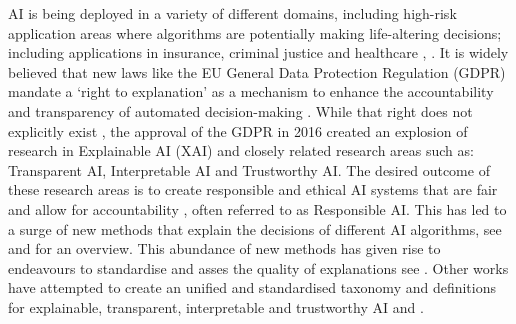 \documentclass[manuscript,screen,review]{acmart}
\begin{document}



AI is being deployed in a variety of different domains, including high-risk application areas where algorithms are potentially making life-altering decisions; including applications in insurance, criminal justice and healthcare \cite{Bohr2020}, \cite{Chen2018}. It is widely believed that new laws like the EU General Data Protection Regulation (GDPR) mandate a ‘right to explanation’ as a mechanism to enhance the accountability and transparency of automated decision-making \cite{Wachter2017}. While that right does not explicitly exist \cite{Wachter2017}, the approval of the GDPR in 2016 created an explosion of research in Explainable AI (XAI) and closely related research areas such as: Transparent AI, Interpretable AI and Trustworthy AI. The desired outcome of these research areas is to create responsible and ethical AI systems that are fair and allow for accountability \cite{Mohseni2021}, often referred to as Responsible AI. This has led to a surge of new methods that explain the decisions of different AI algorithms, see \cite{Linardatos2021} and \cite{Guidotti2018a} for an overview. This abundance of new methods has given rise to endeavours to standardise and asses the quality of explanations see \cite{Gilpin2019}. Other works have attempted to create an unified and standardised taxonomy and definitions for explainable, transparent, interpretable and trustworthy AI \cite{Schwalbe2021} and \cite{Arrieta2020}.
\end{document}
